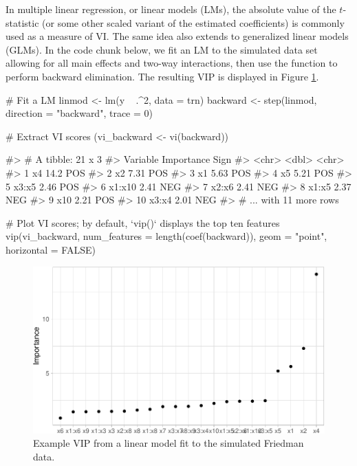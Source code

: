 In multiple linear regression, or linear models (LMs), the absolute
value of the \(t\)-statistic (or some other scaled variant of the
estimated coefficients) is commonly used as a measure of VI. The same
idea also extends to generalized linear models (GLMs). In the code chunk
below, we fit an LM to the simulated  data set allowing for
all main effects and two-way interactions, then use the 
function to perform backward elimination. The resulting VIP is displayed
in Figure \ref{fig:vip-step}.

\begin{Schunk}
\begin{Sinput}
# Fit a LM
linmod <- lm(y ~ .^2, data = trn)
backward <- step(linmod, direction = "backward", trace = 0)

# Extract VI scores
(vi_backward <- vi(backward))
\end{Sinput}
\begin{Soutput}
#> # A tibble: 21 x 3
#>    Variable Importance Sign 
#>    <chr>         <dbl> <chr>
#>  1 x4            14.2  POS  
#>  2 x2             7.31 POS  
#>  3 x1             5.63 POS  
#>  4 x5             5.21 POS  
#>  5 x3:x5          2.46 POS  
#>  6 x1:x10         2.41 NEG  
#>  7 x2:x6          2.41 NEG  
#>  8 x1:x5          2.37 NEG  
#>  9 x10            2.21 POS  
#> 10 x3:x4          2.01 NEG  
#> # ... with 11 more rows
\end{Soutput}
\begin{Sinput}
# Plot VI scores; by default, `vip()` displays the top ten features
vip(vi_backward, num_features = length(coef(backward)), 
    geom = "point", horizontal = FALSE)
\end{Sinput}
\begin{figure}[!htb]

{\centering \includegraphics[width=0.7\linewidth]{greenwell-boehmke_files/figure-latex/vip-step-1} 

}

\caption[Example VIP from a linear model fit to the simulated Friedman data]{Example VIP from a linear model fit to the simulated Friedman data.}\label{fig:vip-step}
\end{figure}
\end{Schunk}

